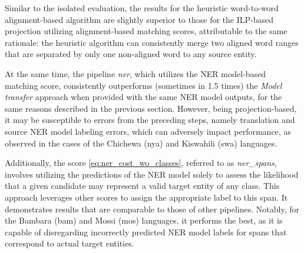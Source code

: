 Similar to the isolated evaluation, the results for the heuristic word-to-word
alignment-based algorithm are slightly superior to those for the ILP-based projection
utilizing alignment-based matching scores, attributable to the same rationale: the
heuristic algorithm can consistently merge two aligned word ranges that are separated
by only one non-aligned word to any source entity.

At the same time, the pipeline \textit{ner}, which utilizes the NER model-based matching
score, consistently outperforms (sometimes in 1.5 times) the \textit{Model transfer} approach when provided with the same
NER model outputs, for the same reasons described in the previous section. However,
being projection-based, it may be susceptible to errors from the preceding steps, namely
translation and source NER model labeling errors, which can adversely impact performance,
as observed in the cases of the Chichewa (nya) and Kiswahili (swa) languages.

Additionally, the score \eqref{eq:ner_cost_wo_classes}, referred to as \textit{ner\_spans},
involves utilizing the predictions of the NER model solely to assess the likelihood
that a given candidate may represent a valid target entity of any class. This approach
leverages other scores to assign the appropriate label to this span.
It demonstrates results that are comparable to those of other pipelines.
Notably, for the Bambara (bam) and Mossi (mos) languages, it performs the best, as
it is capable of disregarding incorrectly predicted NER model labels for spans that
correspond to actual target entities.
